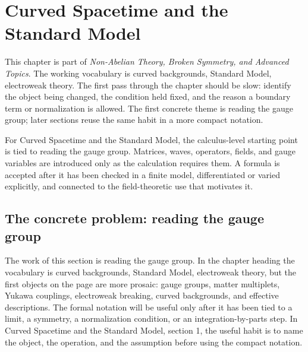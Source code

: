 \chapter{Curved Spacetime and the Standard Model}


This chapter is part of \emph{Non-Abelian Theory, Broken Symmetry, and Advanced Topics}.  The working vocabulary is curved backgrounds, Standard Model, electroweak theory.  The first pass through the chapter should be slow: identify the object being changed, the condition held fixed, and the reason a boundary term or normalization is allowed.  The first concrete theme is reading the gauge group; later sections reuse the same habit in a more compact notation.

For Curved Spacetime and the Standard Model, the calculus-level starting point is tied to reading the gauge group.  Matrices, waves, operators, fields, and gauge variables are introduced only as the calculation requires them.  A formula is accepted after it has been checked in a finite model, differentiated or varied explicitly, and connected to the field-theoretic use that motivates it.

\section{The concrete problem: reading the gauge group}













The work of this section is reading the gauge group.  In the chapter heading the vocabulary is curved backgrounds, Standard Model, electroweak theory, but the first objects on the page are more prosaic: gauge groups, matter multiplets, Yukawa couplings, electroweak breaking, curved backgrounds, and effective descriptions.  The formal notation will be useful only after it has been tied to a limit, a symmetry, a normalization condition, or an integration-by-parts step.  In Curved Spacetime and the Standard Model, section 1, the useful habit is to name the object, the operation, and the assumption before using the compact notation.

